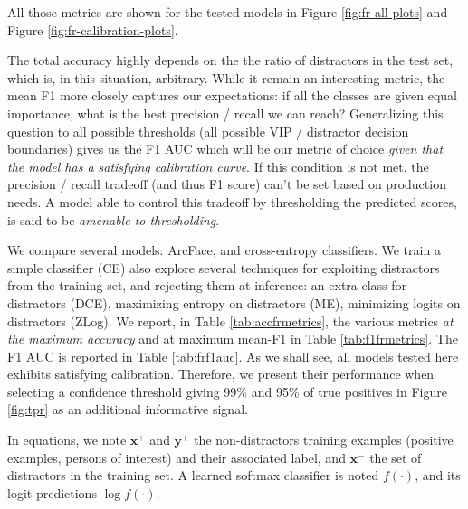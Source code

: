All those metrics are shown for the tested models in Figure \ref{fig:fr-all-plots} and Figure \ref{fig:fr-calibration-plots}.

The total accuracy highly depends on the the ratio of distractors in the test set, which is, in this situation, arbitrary. While it remain an interesting metric, the mean F1 more closely captures our expectations: if all the classes are given equal importance, what is the best precision / recall we can reach? Generalizing this question to all possible thresholds (all possible VIP / distractor decision boundaries) gives us the F1 \ac{AUC} which will be our metric of choice \emph{given that the model has a satisfying calibration curve}. If this condition is not met, the precision / recall tradeoff (and thus F1 score) can't be set based on production needs. A model able to control this tradeoff by thresholding the predicted scores, is said to be \emph{amenable to thresholding}. 

We compare several models: ArcFace, and cross-entropy classifiers. We train a simple classifier (CE) also explore several techniques for exploiting distractors from the training set, and rejecting them at inference:  an extra class for distractors (DCE), maximizing entropy on distractors (ME), minimizing logits on distractors (ZLog). We report, in Table \ref{tab:accfrmetrics}, the various metrics \emph{at the maximum accuracy} and at maximum mean-F1 in Table \ref{tab:f1frmetrics}. The F1 \ac{AUC} is reported in Table \ref{tab:frf1auc}. As we shall see, all models tested here exhibits satisfying calibration. Therefore, we present their performance when selecting a confidence threshold giving 99\% and 95\% of true positives in Figure \ref{fig:tpr} as an additional informative signal.

In equations, we note $\mathbf{x}^+$ and $\mathbf{y}^+$ the non-distractors training examples (positive examples, persons of interest) and their associated label, and $\mathbf{x}^-$ the set of distractors in the training set. A learned softmax classifier is noted $f(\cdot)$, and its logit predictions $\log f(\cdot)$.

